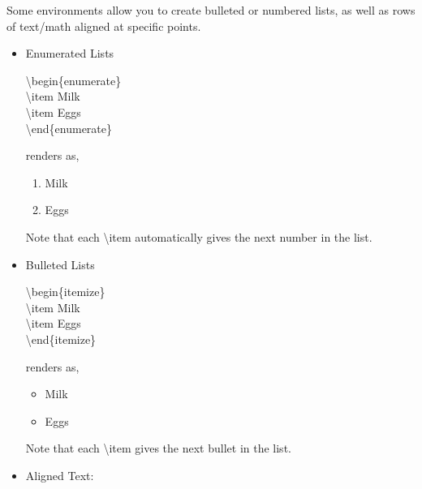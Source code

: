 \documentclass[11pt,onecolumn]{article}
\theoremstyle{definition}
\begin{document}
Some environments allow you to create bulleted or numbered lists, as well as rows of text/math aligned at specific points.

\begin{itemize}
    \item Enumerated Lists \\
    \begin{tcolorbox}
        \textbackslash begin\{enumerate\}\\
        \hspace*{10mm} \textbackslash item Milk \\
        \hspace*{10mm} \textbackslash item Eggs \\
        \textbackslash end\{enumerate\}
    \end{tcolorbox}
    
    renders as,
    
    \begin{enumerate}
    \item Milk
    \item Eggs
    \end{enumerate}
    
    Note that each \textbackslash item automatically gives the next number in the list.
    
    \item Bulleted Lists \\
    \begin{tcolorbox}
        \textbackslash begin\{itemize\}\\
        \hspace*{10mm} \textbackslash item Milk \\
        \hspace*{10mm} \textbackslash item Eggs \\
        \textbackslash end\{itemize\}
    \end{tcolorbox}
    
    renders as,
    
    \begin{itemize}[label=$\bullet$]
        \item Milk
        \item Eggs
    \end{itemize}
        
    Note that each \textbackslash item gives the next bullet in the list. \\
    \item Aligned Text:
    

\end{itemize}
\end{document}
